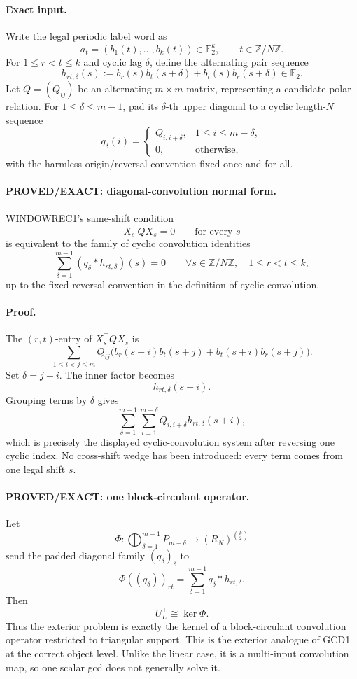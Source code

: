 \documentclass[11pt]{article}
\begin{document}
\paragraph{Exact input.}
Write the legal periodic label word as
\[
a_t=(b_1(t),\ldots,b_k(t))\in\mathbb F_2^k,\qquad t\in\mathbb Z/N\mathbb Z.
\]
For \(1\le r<t\le k\) and cyclic lag \(\delta\), define the alternating pair sequence
\[
h_{rt,\delta}(s):=
b_r(s)b_t(s+\delta)+b_t(s)b_r(s+\delta)\in\mathbb F_2.
\]
Let \(Q=(Q_{ij})\) be an alternating \(m\times m\) matrix, representing a candidate polar relation. For \(1\le\delta\le m-1\), pad its \(\delta\)-th upper diagonal to a cyclic length-\(N\) sequence
\[
q_\delta(i)=
\begin{cases}
Q_{i,i+\delta},&1\le i\le m-\delta,\\
0,&\text{otherwise},
\end{cases}
\]
with the harmless origin/reversal convention fixed once and for all.

\paragraph{PROVED/EXACT: diagonal-convolution normal form.}
WINDOWREC1's same-shift condition
\[
X_s^\top QX_s=0\qquad\text{for every }s
\]
is equivalent to the family of cyclic convolution identities
\[
\boxed{
\sum_{\delta=1}^{m-1}
(q_\delta*h_{rt,\delta})(s)=0
\qquad
\forall s\in\mathbb Z/N\mathbb Z,\quad 1\le r<t\le k,
}
\]
up to the fixed reversal convention in the definition of cyclic convolution.

\paragraph{Proof.}
The \((r,t)\)-entry of \(X_s^\top QX_s\) is
\[
\sum_{1\le i<j\le m}Q_{ij}
\bigl(
b_r(s+i)b_t(s+j)+b_t(s+i)b_r(s+j)
\bigr).
\]
Set \(\delta=j-i\). The inner factor becomes
\[
h_{rt,\delta}(s+i).
\]
Grouping terms by \(\delta\) gives
\[
\sum_{\delta=1}^{m-1}\sum_{i=1}^{m-\delta}
Q_{i,i+\delta}h_{rt,\delta}(s+i),
\]
which is precisely the displayed cyclic-convolution system after reversing one cyclic index. No cross-shift wedge has been introduced: every term comes from one legal shift \(s\).

\paragraph{PROVED/EXACT: one block-circulant operator.}
Let
\[
\Phi:\bigoplus_{\delta=1}^{m-1}P_{m-\delta}
\longrightarrow
(R_N)^{\binom{k}{2}}
\]
send the padded diagonal family \((q_\delta)_\delta\) to
\[
\Phi((q_\delta))_{rt}
=
\sum_{\delta=1}^{m-1}q_\delta*h_{rt,\delta}.
\]
Then
\[
\boxed{U_L^\perp\cong\ker\Phi.}
\]
Thus the exterior problem is exactly the kernel of a block-circulant convolution operator restricted to triangular support. This is the exterior analogue of GCD1 at the correct object level. Unlike the linear case, it is a multi-input convolution map, so one scalar gcd does not generally solve it.
\end{document}
